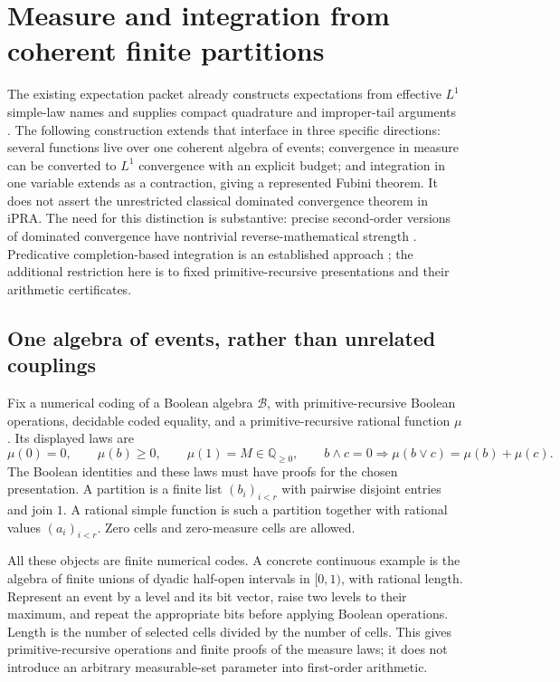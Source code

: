 \section{Measure and integration from coherent finite partitions}
\label{sec:measure}

The existing expectation packet already constructs expectations from effective
\(L^1\) simple-law names and supplies compact quadrature and improper-tail
arguments \cite{repoExpectedValue}.  The following construction extends that
interface in three specific directions: several functions live over one
coherent algebra of events; convergence in measure can be converted to
\(L^1\) convergence with an explicit budget; and integration in one variable
extends as a contraction, giving a represented Fubini theorem.  It does not
assert the unrestricted classical dominated convergence theorem in iPRA.
The need for this distinction is substantive: precise second-order versions
of dominated convergence have nontrivial reverse-mathematical strength
\cite{measureADR2012}.  Predicative completion-based integration is an
established approach \cite{measurePZ2024}; the additional restriction here is
to fixed primitive-recursive presentations and their arithmetic certificates.

\subsection{One algebra of events, rather than unrelated couplings}

\begin{definition}
Fix a numerical coding of a Boolean algebra \(\mathcal B\), with
primitive-recursive Boolean operations, decidable coded equality, and a
primitive-recursive rational function \(\mu\).  Its displayed laws are
\[
 \mu(0)=0,\qquad \mu(b)\geq0,\qquad \mu(1)=M\in\mathbb Q_{\geq0},
 \qquad b\wedge c=0\Longrightarrow
 \mu(b\vee c)=\mu(b)+\mu(c).
\]
The Boolean identities and these laws must have proofs for the chosen
presentation.  A partition is a finite list \((b_i)_{i<r}\) with pairwise
disjoint entries and join \(1\).  A rational simple function is such a
partition together with rational values \((a_i)_{i<r}\).  Zero cells and
zero-measure cells are allowed.
\end{definition}

All these objects are finite numerical codes.  A concrete continuous example
is the algebra of finite unions of dyadic half-open intervals in \([0,1)\),
with rational length.  Represent an event by a level and its bit vector,
raise two levels to their maximum, and repeat the appropriate bits before
applying Boolean operations.  Length is the number of selected cells divided
by the number of cells.  This gives primitive-recursive operations and finite
proofs of the measure laws; it does not introduce an arbitrary measurable-set
parameter into first-order arithmetic.

